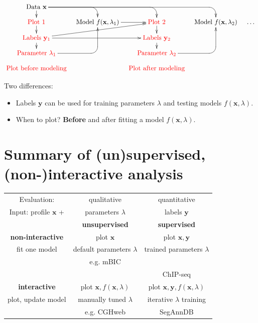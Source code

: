 \documentclass[a4paper,10pt]{article}
\begin{document}
\begin{displaymath}
  \xymatrix@=0.3cm{
    \text{Data $\mathbf x$}
    \ar `[r] [dr] 
    \ar `r[rr] [drr] 
    \ar `r[rrr] [drrr] 
    \ar [d]
    & \text{ }
    & \text{ }
    & \text{ }
    \\
    \textcolor{red}{\text{Plot 1} }
    \ar [d]
    & 
    \text{Model $f(\mathbf x, \lambda_1)$} 
    \ar [r]
    &
    \textcolor{red}{\text{Plot 2} }
    \ar [d]
    & 
    \text{Model $f(\mathbf x, \lambda_2)$}  & \dots
    \\
    \textcolor{red}{\text{Labels $\mathbf y_1$}       }
    \ar [d]
    \ar [rr]
    \ar [rru]
    &
    &
    \textcolor{red}{\text{Labels $\mathbf y_2$}}
    \ar [d]
    \\
    \textcolor{red}{\text{Parameter $\lambda_1$} }
    \ar `r[ruu] [ruu]
    & \text{ }
    & \textcolor{red}{\text{Parameter $\lambda_2$}}
    \ar `r[ruu] [ruu] \\
    \textcolor{red}{\text{Plot before modeling}} &
    &
    \textcolor{red}{\text{Plot after modeling}} 
  }
\end{displaymath}

Two differences:
\begin{itemize}
\item Labels $\mathbf y$ can be used for training parameters $\lambda$
  and testing models $f(\mathbf x, \lambda)$.
\item When to plot? \textbf{Before} and after fitting a model
  $f(\mathbf x, \lambda)$.
\end{itemize}

\section*{Summary of (un)supervised, (non-)interactive analysis}

  \begin{center}
  \begin{tabular}{c|c|c}
    Evaluation: & qualitative &  quantitative \\
    Input: profile $\mathbf x$ + & parameters $\lambda$ & labels $\mathbf y$ \\
        & \textbf{unsupervised} & \textbf{supervised}\\
    \hline
    \textbf{non-interactive}
    & plot $\mathbf x$ & plot $\mathbf x, \mathbf y$\\
    fit one model
    & default parameters $\lambda$ & trained parameters $\lambda$ \\
    & e.g. mBIC \citep{mBIC} & \citep{HOCKING-penalties, HOCKING-breakpoints}\\
    && ChIP-seq \citep{hocking2014visual}\\
    \hline
    \textbf{interactive}
    & plot $\mathbf x, f(\mathbf x, \lambda)$ 
    & plot $\mathbf x, \mathbf y, f(\mathbf x, \lambda)$\\
    plot, update model 
    & manually tuned $\lambda$ & iterative $\lambda$ training\\
    & e.g. CGHweb \citep{CGHweb}  & SegAnnDB \citet{HOCKING-SegAnnDB}
  \end{tabular}
  \end{center}



\end{document}
